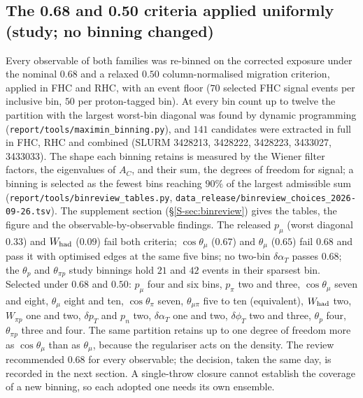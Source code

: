 \subsection{The 0.68 and 0.50 criteria applied uniformly (study; no binning changed)}
Every observable of both families was re-binned on the corrected exposure under the nominal $0.68$
and a relaxed $0.50$ column-normalised migration criterion, applied in FHC and RHC, with an event
floor ($70$ selected FHC signal events per inclusive bin, $50$ per proton-tagged bin). At every bin
count up to twelve the partition with the largest worst-bin diagonal was found by dynamic
programming (\texttt{report/tools/maximin\_binning.py}), and $141$ candidates were extracted in full
in FHC, RHC and combined (SLURM 3428213, 3428222, 3428223, 3433027, 3433033). The shape each binning
retains is measured by the Wiener filter factors, the eigenvalues of $A_C$, and their sum, the degrees
of freedom for signal; a binning is selected as the fewest bins reaching $90\%$ of the largest
admissible sum (\texttt{report/tools/binreview\_tables.py}, \texttt{data\_release/binreview\_choices\_2026-09-26.tsv}).
The supplement section (\S\ref{S-sec:binreview}) gives the tables, the figure and the observable-by-observable
findings. The released $p_\mu$ (worst diagonal $0.33$) and $W_{\rm had}$ ($0.09$) fail both criteria;
$\cos\theta_\mu$ ($0.67$) and $\theta_\mu$ ($0.65$) fail $0.68$ and pass it with optimised edges at the
same five bins; no two-bin $\delta\alpha_T$ passes $0.68$; the $\theta_p$ and $\theta_{\pi p}$ study
binnings hold $21$ and $42$ events in their sparsest bin. Selected under $0.68$ and $0.50$: $p_\mu$ four
and six bins, $p_\pi$ two and three, $\cos\theta_\mu$ seven and eight, $\theta_\mu$ eight and ten,
$\cos\theta_\pi$ seven, $\theta_{\mu\pi}$ five to ten (equivalent), $W_{\rm had}$ two, $W_{\pi p}$ one and
two, $\delta p_T$ and $p_n$ two, $\delta\alpha_T$ one and two, $\delta\phi_T$ two and three, $\theta_p$
four, $\theta_{\pi p}$ three and four. The same partition retains up to one degree of freedom more as
$\cos\theta_\mu$ than as $\theta_\mu$, because the regulariser acts on the density. The review
recommended $0.68$ for every observable; the decision, taken the same day, is recorded in the next
section. A single-throw closure cannot establish the coverage of a new binning, so each adopted one
needs its own ensemble.

